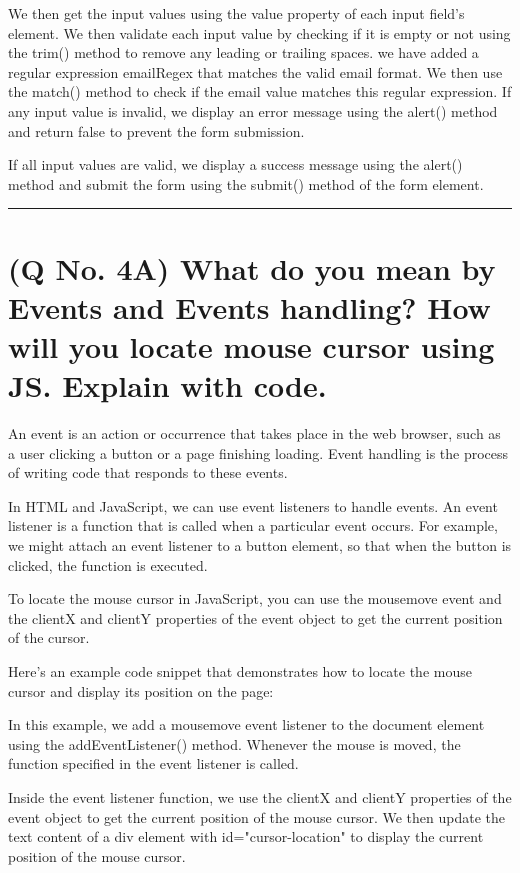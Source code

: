 \documentclass[11pt]{article}
\begin{document}
We then get the input values using the value property of each input field's element. We then validate each input value by checking if it is empty or not using the trim() method to remove any leading or trailing spaces. 
we have added a regular expression emailRegex that matches the valid email format. We then use the match() method to check if the email value matches this regular expression. 
If any input value is invalid, we display an error message using the alert() method and return false to prevent the form submission.

If all input values are valid, we display a success message using the alert() method and submit the form using the submit() method of the form element.

\noindent\rule{\linewidth}{0.4pt}

\section{(Q No. 4A) What do you mean by Events and Events handling? How will you locate mouse cursor using JS. Explain with code.}
An event is an action or occurrence that takes place in the web browser, such as a user clicking a button or a page finishing loading. Event handling is the process of writing code that responds to these events.

In HTML and JavaScript, we can use event listeners to handle events. An event listener is a function that is called when a particular event occurs. For example, we might attach an event listener to a button element, so that when the button is clicked, the function is executed.

To locate the mouse cursor in JavaScript, you can use the mousemove event and the clientX and clientY properties of the event object to get the current position of the cursor.

Here's an example code snippet that demonstrates how to locate the mouse cursor and display its position on the page:

In this example, we add a mousemove event listener to the document element using the addEventListener() method. Whenever the mouse is moved, the function specified in the event listener is called.

Inside the event listener function, we use the clientX and clientY properties of the event object to get the current position of the mouse cursor. We then update the text content of a div element with id="cursor-location" to display the current position of the mouse cursor.
\end{document}
